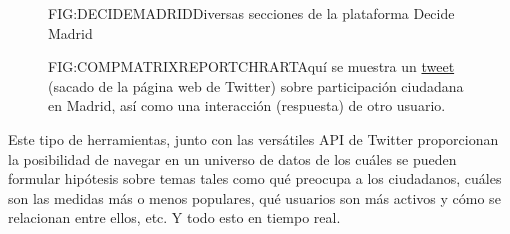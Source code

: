 \begin{figure}[Decide Madrid: Página web]{FIG:DECIDEMADRID}{Diversas secciones de la plataforma Decide Madrid}
	 \quad
\end{figure}

\begin{figure}[Tweet sobre participación ciudadana en Madrid]{FIG:COMPMATRIXREPORTCHRART}{Aquí se muestra un \href{https://twitter.com/BibliotecaCong1/status/1113850234227122176}{tweet} (sacado de la página web de Twitter) sobre participación ciudadana en Madrid, así como una interacción (respuesta) de otro usuario.}
\end{figure}

Este tipo de herramientas, junto con las versátiles API de Twitter proporcionan la posibilidad de navegar en un universo de datos de los cuáles se pueden formular hipótesis sobre temas tales como qué preocupa a los ciudadanos, cuáles son las medidas más o menos populares, qué usuarios son más activos y cómo se relacionan entre ellos, etc. Y todo esto en tiempo real. 

\newpage